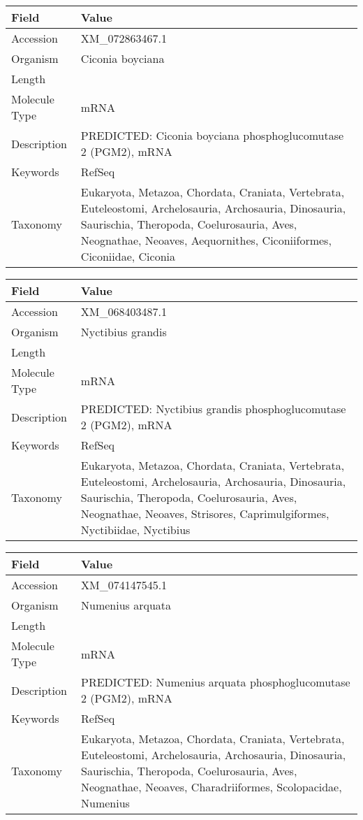 \documentclass[10pt]{article}
\begin{document}
{\footnotesize
\begin{longtable}{>{\raggedright\arraybackslash}p{4.5cm} >{\raggedright\arraybackslash}p{11.5cm}}
\textbf{Field} & \textbf{Value} \\
\hline
Accession & XM\_072863467.1 \\
Organism & Ciconia boyciana \\
Length & 4032 \\
Molecule Type & mRNA \\
Description & PREDICTED: Ciconia boyciana phosphoglucomutase 2 (PGM2), mRNA \\
Keywords & RefSeq \\
Taxonomy & Eukaryota, Metazoa, Chordata, Craniata, Vertebrata, Euteleostomi, Archelosauria, Archosauria, Dinosauria, Saurischia, Theropoda, Coelurosauria, Aves, Neognathae, Neoaves, Aequornithes, Ciconiiformes, Ciconiidae, Ciconia \\
\end{longtable}
}

{\footnotesize
\begin{longtable}{>{\raggedright\arraybackslash}p{4.5cm} >{\raggedright\arraybackslash}p{11.5cm}}
\textbf{Field} & \textbf{Value} \\
\hline
Accession & XM\_068403487.1 \\
Organism & Nyctibius grandis \\
Length & 2210 \\
Molecule Type & mRNA \\
Description & PREDICTED: Nyctibius grandis phosphoglucomutase 2 (PGM2), mRNA \\
Keywords & RefSeq \\
Taxonomy & Eukaryota, Metazoa, Chordata, Craniata, Vertebrata, Euteleostomi, Archelosauria, Archosauria, Dinosauria, Saurischia, Theropoda, Coelurosauria, Aves, Neognathae, Neoaves, Strisores, Caprimulgiformes, Nyctibiidae, Nyctibius \\
\end{longtable}
}

{\footnotesize
\begin{longtable}{>{\raggedright\arraybackslash}p{4.5cm} >{\raggedright\arraybackslash}p{11.5cm}}
\textbf{Field} & \textbf{Value} \\
\hline
Accession & XM\_074147545.1 \\
Organism & Numenius arquata \\
Length & 2929 \\
Molecule Type & mRNA \\
Description & PREDICTED: Numenius arquata phosphoglucomutase 2 (PGM2), mRNA \\
Keywords & RefSeq \\
Taxonomy & Eukaryota, Metazoa, Chordata, Craniata, Vertebrata, Euteleostomi, Archelosauria, Archosauria, Dinosauria, Saurischia, Theropoda, Coelurosauria, Aves, Neognathae, Neoaves, Charadriiformes, Scolopacidae, Numenius \\
\end{longtable}
}
\end{document}
